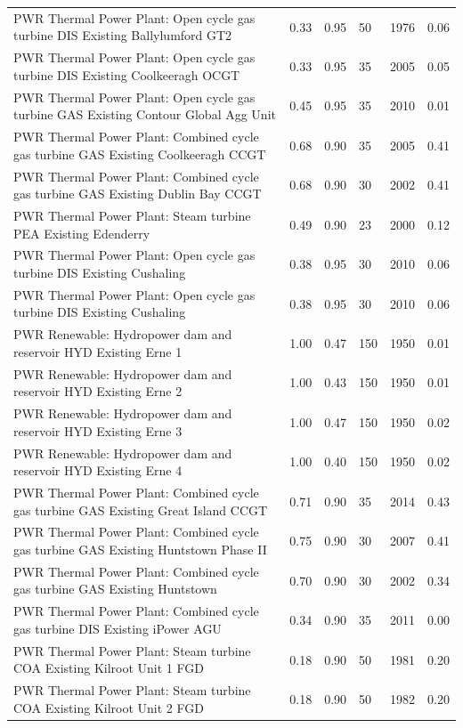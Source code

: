 \documentclass[journal abbreviation, manuscript]{copernicus}
\begin{document}
\begin{center}
\begin{longtable}{p{15em}lllll}
PWR Thermal Power Plant: Open cycle gas turbine DIS Existing Ballylumford GT2 & 0.33 & 0.95 & 50 & 1976 & 0.06 \\
PWR Thermal Power Plant: Open cycle gas turbine DIS Existing Coolkeeragh OCGT & 0.33 & 0.95 & 35 & 2005 & 0.05 \\
PWR Thermal Power Plant: Open cycle gas turbine GAS Existing Contour Global Agg Unit & 0.45 & 0.95 & 35 & 2010 & 0.01 \\
PWR Thermal Power Plant: Combined cycle gas turbine GAS Existing Coolkeeragh CCGT & 0.68 & 0.90 & 35 & 2005 & 0.41 \\
PWR Thermal Power Plant: Combined cycle gas turbine GAS Existing Dublin Bay CCGT & 0.68 & 0.90 & 30 & 2002 & 0.41 \\
PWR Thermal Power Plant: Steam turbine PEA Existing Edenderry & 0.49 & 0.90 & 23 & 2000 & 0.12 \\
PWR Thermal Power Plant: Open cycle gas turbine DIS Existing Cushaling & 0.38 & 0.95 & 30 & 2010 & 0.06 \\
PWR Thermal Power Plant: Open cycle gas turbine DIS Existing Cushaling & 0.38 & 0.95 & 30 & 2010 & 0.06 \\
PWR Renewable: Hydropower dam and reservoir HYD Existing Erne 1 & 1.00 & 0.47 & 150 & 1950 & 0.01 \\
PWR Renewable: Hydropower dam and reservoir HYD Existing Erne 2 & 1.00 & 0.43 & 150 & 1950 & 0.01 \\
PWR Renewable: Hydropower dam and reservoir HYD Existing Erne 3 & 1.00 & 0.47 & 150 & 1950 & 0.02 \\
PWR Renewable: Hydropower dam and reservoir HYD Existing Erne 4 & 1.00 & 0.40 & 150 & 1950 & 0.02 \\
PWR Thermal Power Plant: Combined cycle gas turbine GAS Existing Great Island CCGT & 0.71 & 0.90 & 35 & 2014 & 0.43 \\
PWR Thermal Power Plant: Combined cycle gas turbine GAS Existing Huntstown Phase II & 0.75 & 0.90 & 30 & 2007 & 0.41 \\
PWR Thermal Power Plant: Combined cycle gas turbine GAS Existing Huntstown & 0.70 & 0.90 & 30 & 2002 & 0.34 \\
PWR Thermal Power Plant: Combined cycle gas turbine DIS Existing iPower AGU & 0.34 & 0.90 & 35 & 2011 & 0.00 \\
PWR Thermal Power Plant: Steam turbine COA Existing Kilroot Unit 1 FGD & 0.18 & 0.90 & 50 & 1981 & 0.20 \\
PWR Thermal Power Plant: Steam turbine COA Existing Kilroot Unit 2 FGD & 0.18 & 0.90 & 50 & 1982 & 0.20 \\

\end{longtable}
\end{center}
\end{document}
